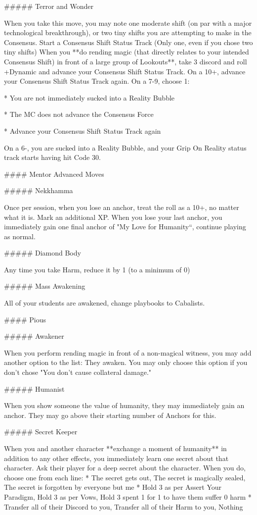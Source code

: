 \documentclass[
  oneside,
  statementpaper,
  9pt]{memoir}
\begin{document}
\begin{Player}
##### Terror and Wonder

When you take this move, you may note one moderate shift (on par with a major technological breakthrough), or two tiny shifts you are attempting to make in the Consensus. Start a Consensus Shift Status Track (Only one, even if you chose two tiny shifts) When you **do rending magic (that directly relates to your intended Consensus Shift) in front of a large group of Lookouts**, take 3 discord and roll +Dynamic and advance your Consensus Shift Status Track. On a 10+, advance your Consensus Shift Status Track again. On a 7-9, choose 1:

* You are not immediately sucked into a Reality Bubble

* The MC does not advance the Consensus Force

* Advance your Consensus Shift Status Track again

On a 6-, you are sucked into a Reality Bubble, and your Grip On Reality status track starts having hit Code 30.

#### Mentor Advanced Moves

##### Nekkhamma

Once per session, when you lose an anchor, treat the roll as a 10+, no matter what it is. Mark an additional XP. When you lose your last anchor, you immediately gain one final anchor of "My Love for Humanity“, continue playing as normal.

##### Diamond Body

Any time you take Harm, reduce it by 1 (to a minimum of 0)

##### Mass Awakening

All of your students are awakened, change playbooks to Cabalists.

#### Pious

##### Awakener

When you perform rending magic in front of a non-magical witness, you may add another option to the list: They awaken. You may only choose this option if you don’t chose "You don’t cause collateral damage."

##### Humanist

When you show someone the value of humanity, they may immediately gain an anchor. They may go above their starting number of Anchors for this.

##### Secret Keeper

When you and another character **exchange a moment of humanity** in addition to any other effects, you immediately learn one secret about that character. Ask their player for a deep secret about the character. When you do, choose one from each line:
* The secret gets out, The secret is magically sealed, The secret is forgotten by everyone but me  
* Hold 3 as per Assert Your Paradigm, Hold 3 as per Vows, Hold 3 spent 1 for 1 to have them suffer 0 harm  
* Transfer all of their Discord to you, Transfer all of their Harm to you, Nothing


\end{Player}
\end{document}
